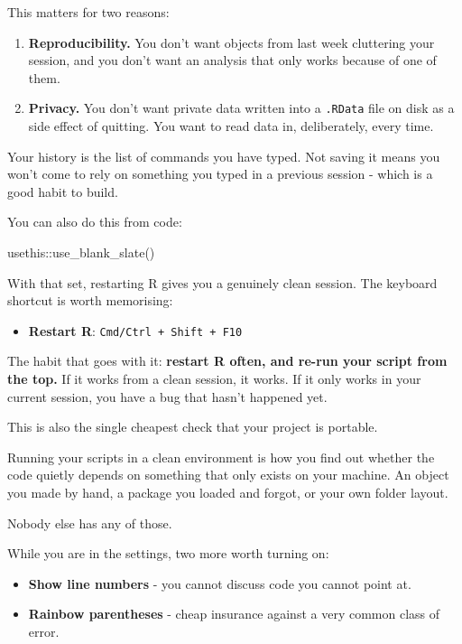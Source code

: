 \documentclass[
  letterpaper,
  justified,
  a4paper]{tufte-book}
\makeatletter
\newenvironment{Shaded}{\begin{snugshade}}{\end{snugshade}}
\newcommand{\FunctionTok}[1]{\textcolor[rgb]{0.28,0.35,0.67}{#1}}
\newcommand{\NormalTok}[1]{\textcolor[rgb]{0.00,0.23,0.31}{#1}}
\newcommand{\SpecialCharTok}[1]{\textcolor[rgb]{0.37,0.37,0.37}{#1}}
\providecommand{\tightlist}{%
  \setlength{\itemsep}{0pt}\setlength{\parskip}{0pt}}
\providecommand{\tightlist}{%
  \setlength{\itemsep}{0pt}\setlength{\parskip}{0pt}}
\let\rbporigShaded\Shaded
\let\rbporigendShaded\endShaded
\renewenvironment{Shaded}{%
  \begingroup
  \ifdim\linewidth=\rbpbodywidth
    \advance\linewidth by \@tufte@overhang
    \advance\hsize by \@tufte@overhang
    \advance\columnwidth by \@tufte@overhang
  \fi
  \rbporigShaded
}{%
  \rbporigendShaded
  \endgroup
}
\makeatother
\begin{document}
This matters for two reasons:

\begin{enumerate}
\def\labelenumi{\arabic{enumi}.}
\tightlist
\item
  \textbf{Reproducibility.} You don't want objects from last week
  cluttering your session, and you don't want an analysis that only
  works because of one of them.
\item
  \textbf{Privacy.} You don't want private data written into a
  \texttt{.RData} file on disk as a side effect of quitting. You want to
  read data in, deliberately, every time.
\end{enumerate}

Your history is the list of commands you have typed. Not saving it means
you won't come to rely on something you typed in a previous session -
which is a good habit to build.

You can also do this from code:

\begin{Shaded}
\begin{Highlighting}[]
\NormalTok{usethis}\SpecialCharTok{::}\FunctionTok{use\_blank\_slate}\NormalTok{()}
\end{Highlighting}
\end{Shaded}

With that set, restarting R gives you a genuinely clean session. The
keyboard shortcut is worth memorising:

\begin{itemize}
\tightlist
\item
  \textbf{Restart R}: \texttt{Cmd/Ctrl\ +\ Shift\ +\ F10}
\end{itemize}

The habit that goes with it: \textbf{restart R often, and re-run your
script from the top.} If it works from a clean session, it works. If it
only works in your current session, you have a bug that hasn't happened
yet.

This is also the single cheapest check that your project is portable.

Running your scripts in a clean environment is how you find out whether
the code quietly depends on something that only exists on your machine.
An object you made by hand, a package you loaded and forgot, or your own
folder layout.

Nobody else has any of those.

While you are in the settings, two more worth turning on:

\begin{itemize}
\tightlist
\item
  \textbf{Show line numbers} - you cannot discuss code you cannot point
  at.
\item
  \textbf{Rainbow parentheses} - cheap insurance against a very common
  class of error.
\end{itemize}
\end{document}
